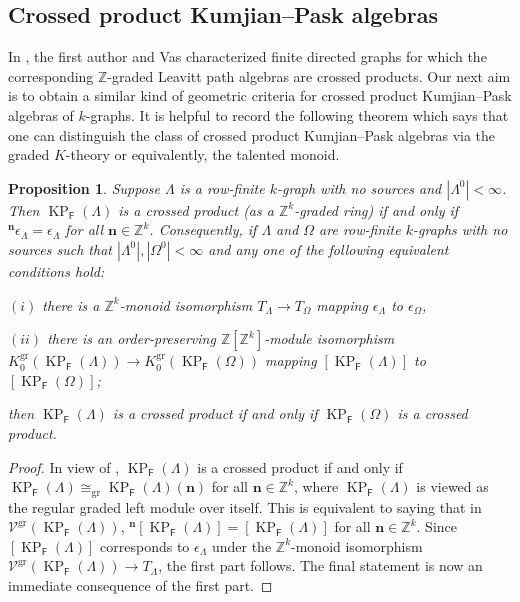 \documentclass[a4paper,reqno,12pt]{amsart}
\numberwithin{equation}{section}
\newtheorem{prop}[thm]{Proposition}
\theoremstyle{definition}
\theoremstyle{remark}
\newcommand{\gr}{\operatorname{gr}}
\newcommand{\KP}{\operatorname{KP}}
\newcommand{\N}{\mathbf{n}}
\begin{document}
\subsection{Crossed product Kumjian--Pask algebras}\label{ssec crosspdt} In \cite{Vas}, the first author and Vas characterized finite directed graphs for which the corresponding $\mathbb{Z}$-graded Leavitt path algebras are crossed products. Our next aim is to obtain a similar kind of geometric criteria for crossed product Kumjian--Pask algebras of $k$-graphs. It is helpful to record the following theorem which says that one can distinguish the class of crossed product Kumjian--Pask algebras via the graded $K$-theory or equivalently, the talented monoid.

\begin{prop}\label{pro TM distinguishing crosspdt KPAs}
Suppose $\Lambda$ is a row-finite $k$-graph with no sources and $|\Lambda^0|<\infty$. Then $\KP_\mathsf{F}(\Lambda)$ is a crossed product (as a $\mathbb{Z}^k$-graded ring) if and only if $^\N \epsilon_\Lambda=\epsilon_\Lambda$ for all $\N\in \mathbb{Z}^k$. Consequently, if $\Lambda$ and $\Omega$ are row-finite $k$-graphs with no sources such that $|\Lambda^0|,|\Omega^0|<\infty$ and any one of the following equivalent conditions hold:

$(i)$ there is a $\mathbb{Z}^k$-monoid isomorphism $T_\Lambda\longrightarrow T_\Omega$ mapping $\epsilon_\Lambda$ to $\epsilon_\Omega$,

$(ii)$ there is an order-preserving $\mathbb{Z}[\mathbb{Z}^k]$-module isomorphism $K_0^{\gr}(\KP_\mathsf{F}(\Lambda))\longrightarrow K_0^{\gr}(\KP_\mathsf{F}(\Omega))$ mapping $[\KP_\mathsf{F}(\Lambda)]$ to $[\KP_\mathsf{F}(\Omega)]$;

then $\KP_\mathsf{F}(\Lambda)$ is a crossed product if and only if $\KP_\mathsf{F}(\Omega)$ is a crossed product. 
\end{prop}
\begin{proof}
In view of \cite[Theorem 2.10.2]{NObook}, $\KP_\mathsf{F}(\Lambda)$ is a crossed product if and only if $\KP_\mathsf{F}(\Lambda)\cong_{\gr}\KP_\mathsf{F}(\Lambda)(\N)$ for all $\N\in \mathbb{Z}^k$, where $\KP_\mathsf{F}(\Lambda)$ is viewed as the regular graded left module over itself. This is equivalent to saying that in $\mathcal{V}^{\gr}(\KP_\mathsf{F}(\Lambda))$, $^\N[\KP_\mathsf{F}(\Lambda)]=[\KP_\mathsf{F}(\Lambda)]$ for all $\N\in \mathbb{Z}^k$. Since $[\KP_\mathsf{F}(\Lambda)]$ corresponds to $\epsilon_\Lambda$ under the $\mathbb{Z}^k$-monoid isomorphism $\mathcal{V}^{\gr}(\KP_\mathsf{F}(\Lambda))\longrightarrow T_\Lambda$, the first part follows. The final statement is now an immediate consequence of the first part.  
\end{proof}
\end{document}
